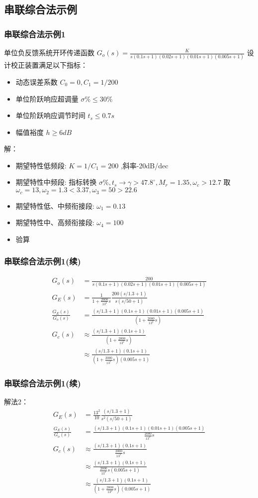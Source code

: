 \documentclass[table]{article}
\begin{document}
\subsection{串联综合法示例}
\label{sec-5-2}
\begin{frame}
\frametitle{串联综合法示例1}
\label{sec-5-2-1}

   单位负反馈系统开环传递函数 $G_o(s)=\frac{K}{s(0.1s+1)(0.02s+1)(0.01s+1)(0.005s+1)}$ 设计校正装置满足以下指标：
\begin{itemize}
\item 动态误差系数 $C_0=0,C_1=1/200$
\item 单位阶跃响应超调量 $\sigma\%\leq30\%$
\item 单位阶跃响应调节时间 $t_s\leq 0.7s$
\item 幅值裕度 $h\geq 6dB$
\end{itemize}
解：
\begin{itemize}
\item <2-> 期望特性低频段: $K=1/C_1=200$ ,斜率-20dB/dec
\item <3-> 期望特性中频段: 指标转换 $\sigma\%,t_s\to \gamma>47.8^{\circ},M_r=1.35,\omega_c>12.7$ 取 $\omega_c=13,\omega_2=1.3<3.37,\omega_3=50>22.6$
\item <4-> 期望特性低、中频衔接段: $\omega_1=0.13$
\item <5-> 期望特性中、高频衔接段: $\omega_4=100$
\item <6-> 验算
\end{itemize}
\end{frame}
\begin{frame}
\frametitle{串联综合法示例1(续)}
\label{sec-5-2-2}

\begin{align*}
G_o(s) &=\frac{200}{s(0.1s+1)(0.02s+1)(0.01s+1)(0.005s+1)} \\
G_E(s) &=\frac{1}{1+\frac{2000}{13^2} s}\frac{200(s/1.3+1)}{s(s/50+1)} \\
\frac{G_E(s)}{G_o(s)} &=\frac{(s/1.3+1)(0.1s+1)(0.01s+1)(0.005s+1)}{(1+\frac{2000}{13^2}s)} \\
G_c(s) &\approx \frac{(s/1.3+1)(0.1s+1)}{(1+\frac{2000}{13^2}s)} \\
&\approx \frac{(s/1.3+1)(0.1s+1)}{(1+\frac{2000}{13^2}s)(0.005s+1)}
\end{align*}
\end{frame}
\begin{frame}
\frametitle{串联综合法示例1(续)}
\label{sec-5-2-3}

解法2：
\begin{align*}
G_E(s) &=\frac{13^2}{10}\frac{(s/1.3+1)}{s^2(s/50+1)} \\
\frac{G_E(s)}{G_o(s)} &=\frac{(s/1.3+1)(0.1s+1)(0.01s+1)(0.005s+1)}{\frac{2000}{13^2}s} \\
G_c(s) &\approx \frac{(s/1.3+1)(0.1s+1)}{\frac{2000}{13^2}s} \\
&\approx \frac{(s/1.3+1)(0.1s+1)}{\frac{2000}{13^2}s(0.005s+1)}\\
&\approx \frac{(s/1.3+1)(0.1s+1)}{(1+\frac{2000}{13^2}s)(0.005s+1)}
\end{align*}
\end{frame}
\end{document}
